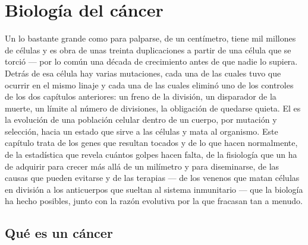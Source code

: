 \chapter{Biología del cáncer}\label{ch:b3:cancer-biology}

Un  lo bastante grande como para palparse, de un centímetro, tiene
mil millones de células y es obra de unas treinta duplicaciones a partir
de una célula que se torció --- por lo común una década de crecimiento
antes de que nadie lo supiera. Detrás de esa célula hay varias
mutaciones, cada una de las cuales tuvo que ocurrir en el mismo linaje y
cada una de las cuales eliminó uno de los controles de los dos capítulos
anteriores: un freno de la división, un disparador de la muerte, un
límite al número de divisiones, la obligación de quedarse quieta. El
 es la evolución de una población celular dentro de un cuerpo, por
mutación y selección, hacia un estado que sirve a las células y mata al
organismo. Este capítulo trata de los genes que resultan tocados y de lo
que hacen normalmente, de la estadística que revela cuántos golpes hacen
falta, de la fisiología que un  ha de adquirir para crecer más allá
de un milímetro y para diseminarse, de las causas que pueden evitarse y
de las terapias --- de los venenos que matan células en división a los
anticuerpos que sueltan al sistema inmunitario --- que la biología ha
hecho posibles, junto con la razón evolutiva por la que fracasan tan a
menudo.

\section{Qué es un cáncer}

